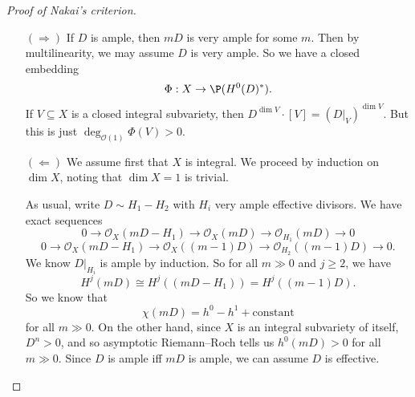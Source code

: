 \documentclass[a4paper]{article}
\begin{document}
\begin{proof}[Proof of Nakai's criterion]\leavevmode
  \begin{itemize}
    \item[$(\Rightarrow)$] If $D$ is ample, then $mD$ is very ample for some $m$. Then by multilinearity, we may assume $D$ is very ample. So we have a closed embedding
      \[
        \Phi: X \to \P(H^0(D)^*).
      \]
      If $V \subseteq X$ is a closed integral subvariety, then $D^{\dim V} \cdot [V] = (D|_V)^{\dim V}$. But this is just $\deg_{\mathcal{O}(1)} \Phi(V) > 0$.
    \item[$(\Leftarrow)$] We assume first that $X$ is integral. We proceed by induction on $\dim X$, noting that $\dim X = 1$ is trivial.

      As usual, write $D \sim H_1 - H_2$ with $H_i$ very ample effective divisors. We have exact sequences
      \[
        0 \to \mathcal{O}_X(mD - H_1) \to \mathcal{O}_X(mD) \to \mathcal{O}_{H_1}(mD) \to 0
      \]
      \[
        0 \to \mathcal{O}_X(mD - H_1) \to \mathcal{O}_X((m - 1)D) \to \mathcal{O}_{H_2}((m - 1)D) \to 0.
      \]
      We know $D|_{H_i}$ is ample by induction. So for all $m \gg 0$ and $j \geq 2$, we have
      \[
        H^j(mD) \cong H^j((mD - H_1)) = H^j((m - 1)D).
      \]
      So we know that
      \[
        \chi(mD) = h^0 - h^1 + \text{constant}
      \]
      for all $m \gg 0$. On the other hand, since $X$ is an integral subvariety of itself, $D^n > 0$, and so asymptotic Riemann--Roch tells us $h^0(mD) > 0$ for all $m \gg 0$. Since $D$ is ample iff $mD$ is ample, we can assume $D$ is effective.


\end{itemize}
\end{proof}
\end{document}
